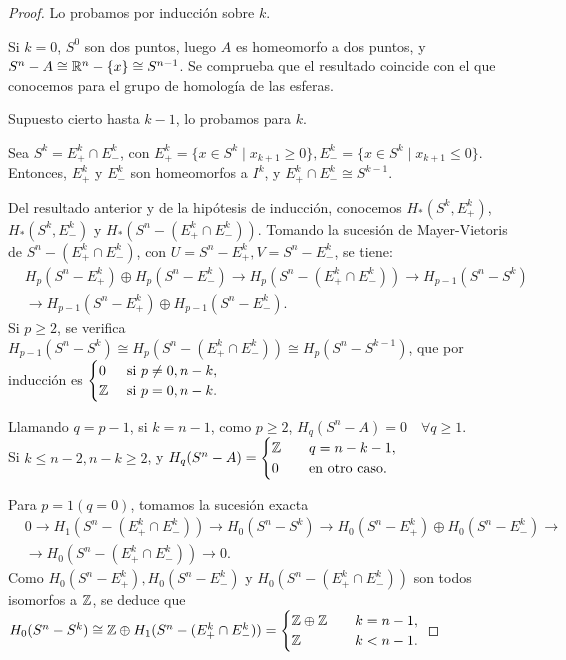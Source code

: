 \begin{proof}
  Lo probamos por inducción sobre $k$.

  Si $k = 0$, $S^0$ son dos puntos, luego $A$ es homeomorfo a dos puntos, y $S^n - A \cong \mathbb{R}^n - \{x\} \cong S^{n-1}$.
  Se comprueba que el resultado coincide con el que conocemos para el grupo de homología de las esferas.

  Supuesto cierto hasta $k - 1$, lo probamos para $k$.

  Sea $S^k = E_+^k \cap E_-^k$, con $E_+^k = \{x \in S^k \mid x_{k+1} \geq 0\}, E_-^k = \{x \in S^k \mid x_{k+1} \leq 0\}$.
  Entonces, $E_+^k$ y $E_-^k$ son homeomorfos a $I^k$, y $E_+^k \cap E_-^k \cong S^{k-1}$.

  Del resultado anterior y de la hipótesis de inducción, conocemos $H_*(S^k, E_+^k)$, $H_*(S^k, E_-^k)$ y $H_*(S^n - (E_+^k \cap E_-^k))$.
  Tomando la sucesión de Mayer-Vietoris de $S^n - (E_+^k \cap E_-^k)$, con $U = S^n - E_+^k, V = S^n - E_-^k$, se tiene:
  \begin{align*}
    &H_p(S^n - E_+^k) \oplus H_p(S^n - E_-^k) \to H_p(S^n - (E_+^k \cap E_-^k)) \to H_{p-1}(S^n - S^k) \\
    &\to H_{p-1}(S^n - E_+^k) \oplus H_{p-1}(S^n - E_-^k).
  \end{align*}
  Si $p \geq 2$, se verifica $H_{p-1}(S^n - S^k) \cong H_p(S^n - (E_+^k \cap E_-^k)) \cong H_p(S^n - S^{k-1})$,
  que por inducción es $\begin{cases} 0 &\text{ si } p \neq 0, n-k, \\ \mathbb{Z} &\text{ si } p = 0, n-k. \end{cases}$

  Llamando $q = p-1$, si $k = n-1$, como $p \geq 2$, $H_q(S^n - A) = 0 \quad \forall q \geq 1$.\\
  Si $k \leq n-2, n-k \geq 2$, y $H_q(S^n - A) = \begin{cases} \mathbb{Z} &\quad q = n-k-1, \\ 0 &\quad \text{en otro caso.} \end{cases}$

  Para $p = 1 (q = 0)$, tomamos la sucesión exacta
  \begin{align*}
    &0 \to H_1(S^n - (E_+^k \cap E_-^k)) \to H_0(S^n - S^k) \to H_0(S^n - E_+^k) \oplus H_0(S^n - E_-^k) \to \\
    &\to H_0(S^n - (E_+^k \cap E_-^k)) \to 0.
  \end{align*}
  Como $H_0(S^n - E_+^k), H_0(S^n - E_-^k)$ y $H_0(S^n - (E_+^k \cap E_-^k))$ son todos isomorfos a $\mathbb{Z}$,
  se deduce que $H_0(S^n - S^k) \cong \mathbb{Z} \oplus H_1(S^n - (E_+^k \cap E_-^k)) = \begin{cases} \mathbb{Z} \oplus \mathbb{Z} &\quad k = n-1, \\
                                                                                                    \mathbb{Z} &\quad k < n - 1.  \end{cases} $
\end{proof}


